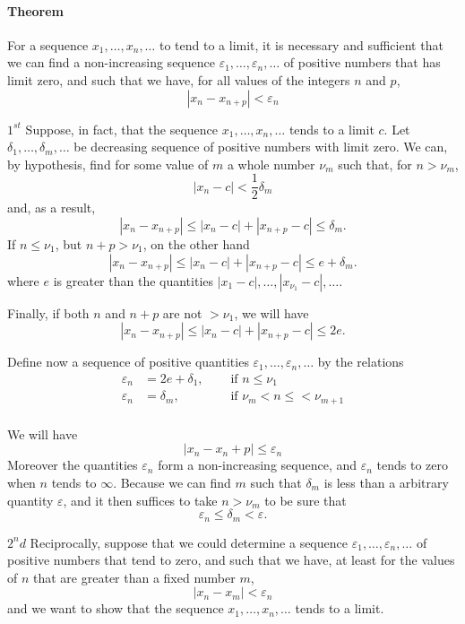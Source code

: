 \documentclass[10pt,letterpaper]{book}
\renewcommand\epsilon{\varepsilon}
\theoremstyle{definition}
\begin{document}
\paragraph{Theorem} For a sequence $x_1,\dots,x_n,\dots$ to tend to a limit, it is necessary and sufficient that we can find a non-increasing sequence $\epsilon_1,\dots,\epsilon_n,\dots$ of positive numbers that has limit zero, and such that we have, for all values of the integers $n$ and $p$,
\[
  |x_n-x_{n+p}|<\epsilon_n
\]

\newcommand{\jseq}[2]{{#1}, \dots, {#2}, \dots}
$1^{st}$ Suppose, in fact, that the sequence $\jseq{x_1}{x_n}$ tends to a limit $c$. Let $\jseq{\delta_1}{\delta_m}$ be decreasing sequence of positive numbers with limit zero. We can, by hypothesis, find for some value of $m$ a whole number $\nu_m$ such that, for $n>\nu_m$,
\[
  |x_n-c|<\frac 1 2 \delta_m
\]
and, as a result,
\[
  |x_n-x_{n+p}| \leq |x_n - c| + |x_{n+p}-c|\leq\delta_m.
\]
If $n\leq \nu_1$, but $n+p>\nu_1$, on the other hand
\[
  |x_n-x_{n+p}| \leq |x_n - c| + |x_{n+p}-c|\leq e+\delta_m.
\]
where $e$ is greater than the quantities $\jseq{|x_1-c|}{|x_{\nu_1}-c|}$.


Finally, if both $n$ and $n+p$ are not $>\nu_1$, we will have
\[
  |x_n-x_{n+p}| \leq |x_n - c| + |x_{n+p}-c|\leq 2e.
\]

Define now a sequence of positive quantities $\jseq{\epsilon_1}{\epsilon_n}$ by the relations
\begin{align*}
  \epsilon_n &= 2e+\delta_1,\quad&\mbox{ if }n\leq \nu_1\\
  \epsilon_n &= \delta_m,\quad&\mbox{ if }\nu_m<n\leq<\nu_{m+1}\\
\end{align*}

We will have
\[
  |x_n-x_n+p|\leq \epsilon_n
\]
Moreover the quantities $\epsilon_n$ form a non-increasing sequence, and $\epsilon_n$ tends to zero when $n$ tends to $\infty$. Because we can find $m$ such that $\delta_m$ is less than a arbitrary quantity $\epsilon$, and it then suffices to take $n>\nu_m$ to be sure that
\[
  \epsilon_n\leq \delta_m<\epsilon.
\]

$2^nd$ Reciprocally, suppose that we could determine a sequence  $\jseq{\epsilon_1}{\epsilon_n}$ of positive numbers that tend to zero, and such that we have, at least for the values of $n$ that are greater than a fixed number $m$,
\begin{equation}\label{eqn:1}
  |x_n-x_m|<\epsilon_n
\end{equation}
and we want to show that the sequence $\jseq{x_1}{x_n}$ tends to a limit.
\end{document}
